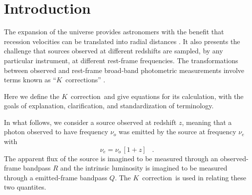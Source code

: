\documentclass[preprint]{aastex}
\newcommand{\kcorrection}{$K$~correction}
\newcommand{\kcorrections}{{\kcorrection}s}
\newcommand{\nuobs}{\nu_o}
\newcommand{\nuemit}{\nu_e}
\begin{document}
\title{\scalebox{1.5}{The \kcorrection}}
\author{
  David W. Hogg,
  Ivan K. Baldry,
  Michael Blanton,
  and
  Daniel J. Eisenstein
  \\ \textsl{fifth draft---2002 August 15}
}

\begin{abstract}
The \kcorrection\ is part of the relation between the emitted- or
rest-frame absolute magnitude of a source in one broad photometric
bandpass to the observed-frame apparent magnitude of the same source
in another broad bandpass.  This short paper provides definitions,
equations and pedagogical discussion related to the \kcorrection.
\end{abstract}

\section{Introduction}

The expansion of the universe provides astronomers with the benefit
that recession velocities can be translated into radial distances
\citep[eg,][and references therein]{hogg99cosm}.  It also presents the
challenge that sources observed at different redshifts are sampled, by
any particular instrument, at different rest-frame frequencies.  The
transformations between observed and rest-frame broad-band photometric
measurements involve terms known as ``\kcorrections''
\citep*{humason56a, oke68a}.

Here we define the \kcorrection\ and give equations for its
calculation, with the goals of explanation, clarification, and
standardization of terminology.

In what follows, we consider a source observed at redshift $z$,
meaning that a photon observed to have frequency $\nuobs$ was emitted
by the source at frequency $\nuemit$ with
\begin{equation}
\nuemit = \nuobs\,[1+z] \;\;\;.
\end{equation}
The apparent flux of the source is imagined to be measured through an
observed-frame bandpass $R$ and the intrinsic luminosity is imagined
to be measured through a emitted-frame bandpass $Q$.  The
\kcorrection\ is used in relating these two quantites.
\end{document}
